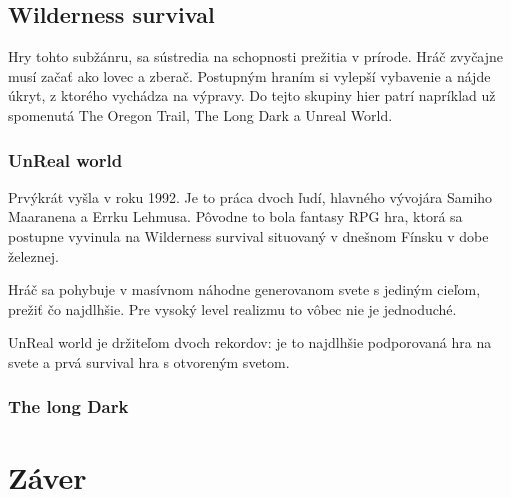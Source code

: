 \documentclass[10pt,twoside,slovak,a4paper]{article}
\begin{document}
\subsection{Wilderness survival}

Hry tohto subžánru, sa sústredia na schopnosti prežitia v prírode. Hráč zvyčajne musí začať ako lovec a zberač. Postupným hraním si vylepší vybavenie a nájde úkryt, z ktorého vychádza na výpravy. Do tejto skupiny hier patrí napríklad už spomenutá The Oregon Trail, The Long Dark a Unreal World.

\subsubsection{UnReal world}
Prvýkrát vyšla v roku 1992. Je to práca dvoch ľudí, hlavného vývojára Samiho Maaranena a Errku Lehmusa. Pôvodne to bola fantasy RPG hra, ktorá sa postupne vyvinula na Wilderness survival situovaný v dnešnom Fínsku v dobe železnej. 

Hráč sa pohybuje v masívnom náhodne generovanom svete s jediným cieľom, prežiť čo najdlhšie. Pre vysoký level realizmu to vôbec nie je jednoduché. 

UnReal world je držiteľom dvoch rekordov: je to najdlhšie podporovaná hra na svete a prvá survival hra s otvoreným svetom.

\subsubsection{The long Dark}


\cite{Reid}








\section{Záver} \label{zaver} %




\newpage

\end{document}
